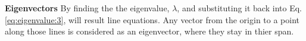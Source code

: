             \bulletpar \textbf{Eigenvectors} By finding the the eigenvalue, $\lambda$, and substituting it back into Eq.\eqref{eq:eigenvalue:3}, will result line
            equations. Any vector from the origin to a point along those lines is considered as an eigenvector, where they stay in thier span.

